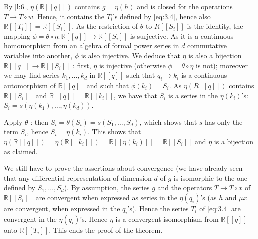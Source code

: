 \documentclass[a4paper,12pt]{article}
\newcommand{\R}{\mathbb{R}}
\begin{document}

By \cref{l:6}, $\eta(\R[[q]])$ contains $g=\eta(h)$ and is closed for the operations ${T} \rightarrow {T} \circ {w}$. 
Hence, it contains the ${T}_i$'s defined by \eqref{eq:3.4}, hence also $\R[[T_i]]=\R[[S_i]]$.
As the restriction of $\theta$ to ${R}\left[\left[{S}_i\right]\right]$ is the identity, the mapping $\phi=\theta \circ \eta: \R[[q]] \to \R[[S_i]]$ is surjective. 
As it is a continuous homomorphism from an algebra of formal power series in $d$ commutative variables into another, $\phi$ is also injective.
We deduce that $\eta$ is also a bijection $\R[[q]] \to \R[[S_i]]$ : first, $\eta$ is injective (otherwise $\phi=\theta \circ \eta$ is not); moreover we may find series $k_1, \ldots, k_d$ in $\R[[q]]$ such that $q_i \to k_i$ is a continuous automorphism of $\R[[q]]$ and such that $\phi\left(k_i\right)=S_i$. 
As $\eta(R[[q]])$ contains $\R[[S_i]]$ and $\R[[q]]=\R[[k_i]]$, we have that $S_i$ is a series in the $\eta\left(k_i\right)$'s: $S_i = s(\eta(k_1), \dotsc, \eta(k_d))$.

Apply $\theta$ : then $S_i=\theta\left(S_i\right)=s\left(S_1, \ldots, S_d\right)$, which shows that $s$ has only the term $S_i$, hence $S_i=\eta\left(k_i\right)$. This shows that $\eta(\R[[q]])= \eta(\R[[k_i]]) = \R[[\eta(k_i)]] = \R[[S_i]]$ and $\eta$ is a bijection as claimed.

We still have to prove the assertions about convergence (we have already seen that any differential representation of dimension ${d}$ of ${g}$ is isomorphic to the one defined by $S_1, \ldots, S_d$). 
By assumption, the series $g$ and the operators $T \rightarrow T \circ x$ of $\R[[S_i]]$ are convergent when expressed as series in the $\eta\left({q}_i\right)$'s (as $h$ and $\mu x$ are convergent, when expressed in the $q_i$'s). 
Hence the series $T_i$ of \eqref{eq:3.4} are convergent in the $\eta(q_i)$'s. 
Hence $\eta$ is a convergent isomorphism from $\R[[q]]$ onto $\R[[T_i]]$.
This ends the proof of the theorem.

\color{black}
\end{document}
